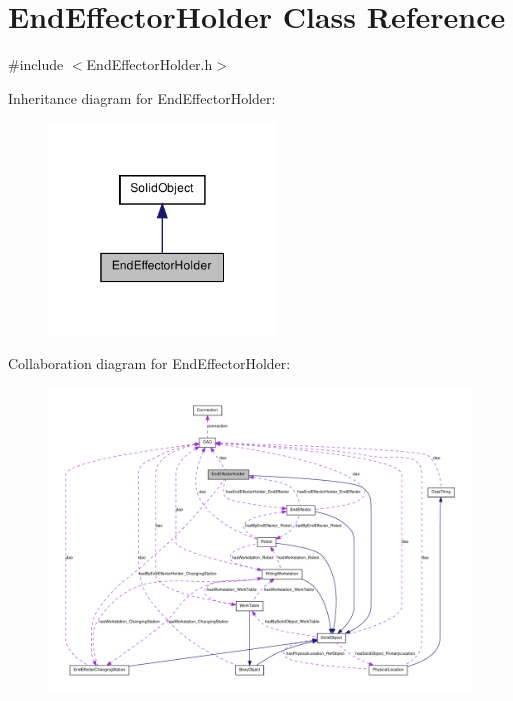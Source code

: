 \hypertarget{class_end_effector_holder}{
\section{EndEffectorHolder Class Reference}
\label{class_end_effector_holder}
}


{\ttfamily \#include $<$EndEffectorHolder.h$>$}



Inheritance diagram for EndEffectorHolder:\nopagebreak
\begin{figure}[H]
\begin{center}
\leavevmode
\includegraphics[width=172pt]{class_end_effector_holder__inherit__graph}
\end{center}
\end{figure}


Collaboration diagram for EndEffectorHolder:\nopagebreak
\begin{figure}[H]
\begin{center}
\leavevmode
\includegraphics[width=400pt]{class_end_effector_holder__coll__graph}
\end{center}
\end{figure}
